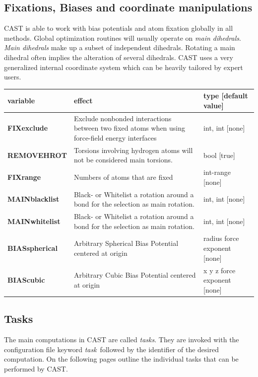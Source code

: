 \documentclass[10pt,a4paper]{article} %
\begin{document}
\subsection{Fixations, Biases and coordinate manipulations}
\ac{CAST} is able to work with bias potentials and atom fixation globally in all methods. Global optimization routines will usually operate on \textit{main dihedrals}. \textit{Main dihedrals} make up a subset of independent dihedrals. Rotating a main dihedral often implies the alteration of several dihedrals. \ac{CAST} uses a very generalized internal coordinate system which can be heavily tailored by expert users.
\begin{longtable}{|p{3.5cm}|p{5cm}|p{3cm}|}
	variable & effect & type [default value] \\
	\hline
	\textbf{FIXexclude} & Exclude nonbonded interactions between two fixed atoms when using force-field energy interfaces & int, int [none] \\
	\textbf{REMOVEHROT} & Torsions involving hydrogen atoms will not be considered main torsions. & bool [true] \\	
	\textbf{FIXrange} & Numbers of atoms that are fixed & int-range [none] \\
	\textbf{MAINblacklist} & Black- or Whitelist a rotation around a bond for the selection as main rotation. & int, int [none] \\
	\textbf{MAINwhitelist} & Black- or Whitelist a rotation around a bond for the selection as main rotation. & int, int [none] \\
	\textbf{BIASspherical} & Arbitrary Spherical Bias Potential centered at origin & radius force exponent [none] \\
	\textbf{BIAScubic} & Arbitrary Cubic Bias Potential centered at origin & x y z force exponent [none] \\
\end{longtable} 
	
	
	\subsection{Tasks}
	The main computations in \ac{CAST} are called \textit{tasks}. They are invoked with the configuration file keyword \glqq\textit{task}\grqq~followed by the identifier of the desired computation. On the following pages outline the individual tasks that can be performed by \ac{CAST}.

	\newpage

\end{document}
